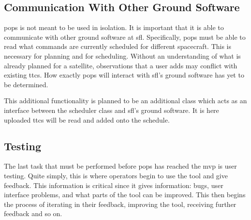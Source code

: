 \subsection{Communication With Other Ground Software}

\gls{pops} is not meant to be used in isolation. It is important that it is
able to communicate with other ground software at \gls{sfl}. Specifically,
\gls{pops} must be able to read what commands are currently scheduled for
different spacecraft. This is necessary for planning and for scheduling.
Without an understanding of what is already planned for a satellite,
observations that a user adds may conflict with existing \glspl{ttc}. 
How exactly \gls{pops} will interact with \gls{sfl}'s ground software has yet
to be determined.  

This additional functionality is planned to be an additional class which acts
as an interface between the scheduler class and \gls{sfl}'s ground software. It
is here uploaded \glspl{ttc} will be read and added onto the schedule.



\subsection{Testing}

The last task that must be performed before \gls{pops} has reached the
\gls{mvp} is user testing. Quite simply, this is where operators begin to use
the tool and give feedback. This information is critical since it gives
information: bugs, user interface problems, and what parts of the tool can be
improved.  This then begins the process of iterating in their feedback,
improving the tool, receiving further feedback and so on.


